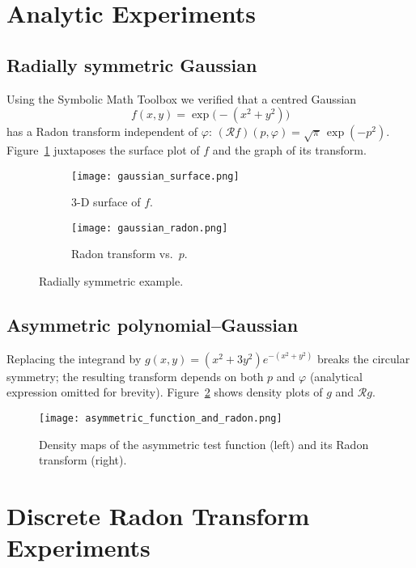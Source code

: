 \documentclass[11pt]{article}
\begin{document}
\section{Analytic Experiments}

\subsection{Radially symmetric Gaussian}

Using the Symbolic Math Toolbox we verified that a centred Gaussian
\[
  f(x,y)=\exp\!\bigl(-(x^{2}+y^{2})\bigr)
\]
has a Radon transform independent of \( \varphi \):
\(
  (\mathcal R f)(p,\varphi)=\sqrt{\pi}\,\exp(-p^{2})
\).
Figure~\ref{fig:gaussian} juxtaposes the surface plot of \(f\) and the
graph of its transform.

\begin{figure}[h]
\centering
\begin{subfigure}[b]{0.47\textwidth}
  \texttt{[image: gaussian\_surface.png]}
  \caption{3-D surface of \(f\).}
\end{subfigure}
\hfill
\begin{subfigure}[b]{0.47\textwidth}
  \texttt{[image: gaussian\_radon.png]}
  \caption{Radon transform vs.\ \(p\).}
\end{subfigure}
\caption{Radially symmetric example.}
\label{fig:gaussian}
\end{figure}

\subsection{Asymmetric polynomial–Gaussian}

Replacing the integrand by
\( g(x,y)=(x^{2}+3y^{2})e^{-(x^{2}+y^{2})} \)
breaks the circular symmetry; the resulting transform depends on
both \(p\) and \(\varphi\) (analytical expression omitted for brevity).
Figure~\ref{fig:asymmetric} shows density plots of \(g\) and
\(\mathcal Rg\).

\begin{figure}[h]
\centering
\texttt{[image: asymmetric\_function\_and\_radon.png]}
\caption{Density maps of the asymmetric test function (left) and its
Radon transform (right).\label{fig:asymmetric}}
\end{figure}

\section{Discrete Radon Transform Experiments}
\end{document}
